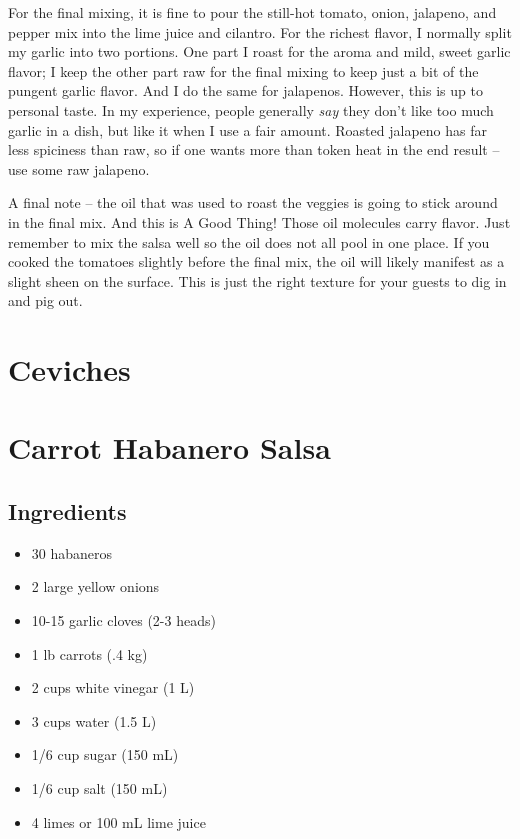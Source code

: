 For the final mixing, it is fine to pour the still-hot tomato, onion, jalapeno, and pepper mix into the lime juice and cilantro. For the richest flavor, I normally split my garlic into two portions. One part I roast for the aroma and mild, sweet garlic flavor; I keep the other part raw for the final mixing to keep just a bit of the pungent garlic flavor. And I do the same for jalapenos. However, this is up to personal taste. In my experience, people generally \textit{say} they don't like too much garlic in a dish, but like it when I use a fair amount. Roasted jalapeno has far less spiciness than raw, so if one wants more than token heat in the end result -- use some raw jalapeno.

A final note -- the oil that was used to roast the veggies is going to stick around in the final mix. And this is A Good Thing! Those oil molecules carry flavor.  Just remember to mix the salsa well so the oil does not all pool in one place. If you cooked the tomatoes slightly before the final mix, the oil will likely manifest as a slight sheen on the surface. This is just the right texture for your guests to dig in and pig out.

\newpage \section{Ceviches}

\newpage  \section{Carrot Habanero Salsa}

\subsection{Ingredients} \begin{itemize}
    \item 30 habaneros
    \item 2 large yellow onions
    \item 10-15 garlic cloves (2-3 heads)
    \item 1 lb carrots (.4 kg)
    \item 2 cups white vinegar (1 L)
    \item 3 cups water (1.5 L)
    \item 1/6 cup sugar (150 mL)
    \item 1/6 cup salt (150 mL)
    \item 4 limes or 100 mL lime juice
\end{itemize}

